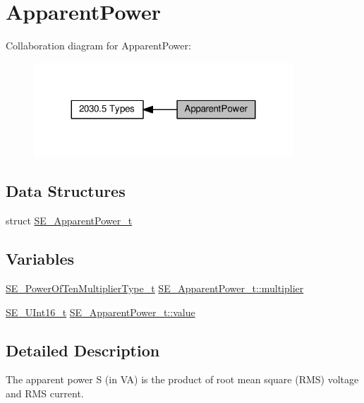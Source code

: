 \hypertarget{group__ApparentPower}{}\section{Apparent\+Power}
\label{group__ApparentPower}
Collaboration diagram for Apparent\+Power\+:\nopagebreak
\begin{figure}[H]
\begin{center}
\leavevmode
\includegraphics[width=275pt]{group__ApparentPower}
\end{center}
\end{figure}
\subsection*{Data Structures}
\begin{DoxyCompactItemize}
\item 
struct \hyperlink{structSE__ApparentPower__t}{S\+E\+\_\+\+Apparent\+Power\+\_\+t}
\end{DoxyCompactItemize}
\subsection*{Variables}
\begin{DoxyCompactItemize}
\item 
\hyperlink{group__PowerOfTenMultiplierType_gaf0317b781dc8dbb9cb6ac4e44a14fdef}{S\+E\+\_\+\+Power\+Of\+Ten\+Multiplier\+Type\+\_\+t} \hyperlink{group__ApparentPower_gac045971a97fa5b740ae1bb7b27b6003e}{S\+E\+\_\+\+Apparent\+Power\+\_\+t\+::multiplier}
\item 
\hyperlink{group__UInt16_gac68d541f189538bfd30cfaa712d20d29}{S\+E\+\_\+\+U\+Int16\+\_\+t} \hyperlink{group__ApparentPower_ga3e723545220f4a3a11f93e67620b3bd3}{S\+E\+\_\+\+Apparent\+Power\+\_\+t\+::value}
\end{DoxyCompactItemize}


\subsection{Detailed Description}
The apparent power S (in VA) is the product of root mean square (R\+MS) voltage and R\+MS current. 

